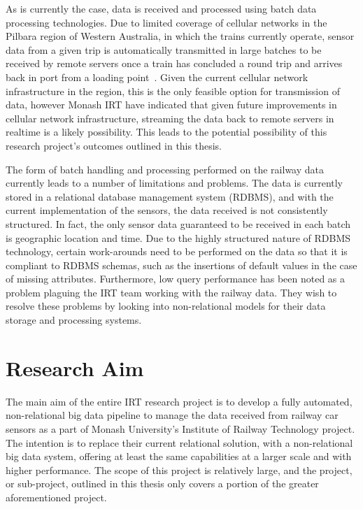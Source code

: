As is currently the case, data is received and processed using batch data processing technologies. Due to limited coverage
of cellular networks in the Pilbara region of Western Australia, in which the trains currently operate, sensor data from
a given trip is automatically transmitted in large batches to be received by remote servers once a train has concluded a
round trip and
arrives back in port from a loading point~\cite{thomas2012taking}. Given the current cellular network infrastructure in
the region, this is the only feasible option for transmission of data, however Monash IRT have indicated that given
future improvements in cellular network infrastructure, streaming the data back to remote servers in realtime is a likely
possibility. This leads to the potential possibility of this research project's outcomes outlined in this thesis.

The form of batch handling and processing performed on the railway data currently leads to a number of limitations and
problems. The data is currently stored in a relational database management system (RDBMS), and with the current
implementation
of the sensors, the data received is not consistently structured. In fact, the only sensor data guaranteed to be received
in each batch is geographic location and time. Due to the highly structured nature of RDBMS technology, certain work-arounds
need to be performed on the data so that it is compliant to RDBMS schemas, such as the insertions of default values in
the case of missing attributes. Furthermore, low query performance has been noted as a problem plaguing the IRT team
working with the railway data. They wish to resolve these problems by looking into non-relational models for their data
storage and processing systems.





\section{Research Aim} %
\label{sec:objectives}

The main aim of the entire IRT research project is to develop a fully automated, non-relational big data pipeline to manage
the data received from railway car sensors as a part of Monash University's Institute of Railway Technology project. The
intention is to replace their current relational solution, with a non-relational big data system, offering at least the same capabilities at a larger scale and
with higher performance. The scope of this project is relatively large, and the project, or sub-project, outlined in this
thesis only covers a portion of the greater aforementioned project.


